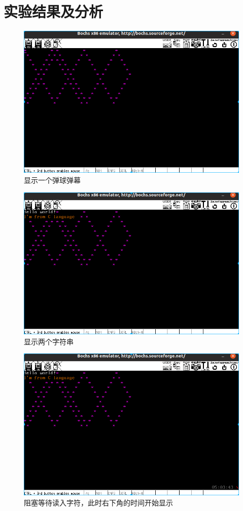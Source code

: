 \documentclass[a4paper,11pt,UTF8]{ctexart}
\newcommand{\bottomcaption}{%
\setlength{\abovecaptionskip}{6pt}%
\setlength{\belowcaptionskip}{6pt}%
\caption}
\begin{document}
\section{实验结果及分析}
	\begin{figure}[htbp]
		\centering
		\includegraphics[width=15cm]{img/1.png}
		\bottomcaption{显示一个弹球弹幕}
	\end{figure}
	\begin{figure}[htbp]
		\centering
		\includegraphics[width=15cm]{img/2.png}
		\bottomcaption{显示两个字符串}
	\end{figure}
	\begin{figure}[htbp]
		\centering
		\includegraphics[width=15cm]{img/3.png}
		\bottomcaption{阻塞等待读入字符，此时右下角的时间开始显示}
	\end{figure}
\end{document}
